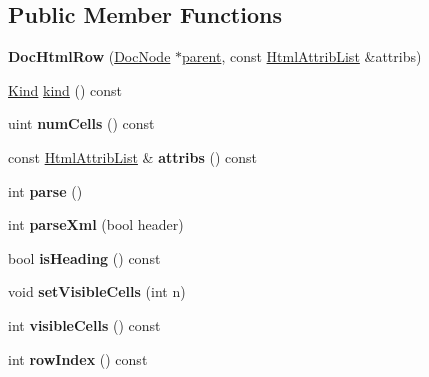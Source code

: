 \subsection*{Public Member Functions}
\begin{DoxyCompactItemize}
\item 
\mbox{\label{class_doc_html_row_a7da5a9ce865c561c0aa9c8378ac91d83}} 
{\bfseries Doc\+Html\+Row} (\mbox{\hyperlink{class_doc_node}{Doc\+Node}} $\ast$\mbox{\hyperlink{class_doc_node_a73e8ad29a91cfceb0968eb00db71a23d}{parent}}, const \mbox{\hyperlink{class_html_attrib_list}{Html\+Attrib\+List}} \&attribs)
\item 
\mbox{\hyperlink{class_doc_node_aebd16e89ca590d84cbd40543ea5faadb}{Kind}} \mbox{\hyperlink{class_doc_html_row_a0988c30f6aae1a0b855ab4cf485b868f}{kind}} () const
\item 
\mbox{\label{class_doc_html_row_ac3be0fa83b0f21913486a85c26c3d5c3}} 
uint {\bfseries num\+Cells} () const
\item 
\mbox{\label{class_doc_html_row_abc9e51382f553af06eef273eae3f24a1}} 
const \mbox{\hyperlink{class_html_attrib_list}{Html\+Attrib\+List}} \& {\bfseries attribs} () const
\item 
\mbox{\label{class_doc_html_row_ad3a01dad6a2318647d5eb3e8d3d4ac90}} 
int {\bfseries parse} ()
\item 
\mbox{\label{class_doc_html_row_ae3b8511bd72b445cdf33c2e0b8ea58e7}} 
int {\bfseries parse\+Xml} (bool header)
\item 
\mbox{\label{class_doc_html_row_ac231c8ffe50ea474d33cacd7c3d14b77}} 
bool {\bfseries is\+Heading} () const
\item 
\mbox{\label{class_doc_html_row_a9bba32b3b39b4dafdf607acb6aac1514}} 
void {\bfseries set\+Visible\+Cells} (int n)
\item 
\mbox{\label{class_doc_html_row_abe99898ca235054b819c2516b5838fc5}} 
int {\bfseries visible\+Cells} () const
\item 
\mbox{\label{class_doc_html_row_a6ffe6f9cc6295f347a24fef5d7969b32}} 
int {\bfseries row\+Index} () const
\end{DoxyCompactItemize}
